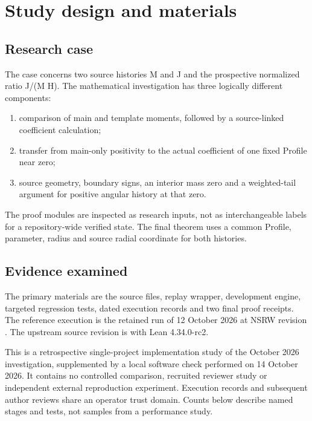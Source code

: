 \documentclass[11pt,a4paper]{article}
\begin{document}
\section{Study design and materials}

\subsection{Research case}

The case concerns two source histories M and J and the prospective normalized ratio J/(M H). The mathematical investigation has three logically different components:

\begin{enumerate}
\item comparison of main and template moments, followed by a source-linked coefficient calculation;
\item transfer from main-only positivity to the actual coefficient of one fixed Profile near zero;
\item source geometry, boundary signs, an interior mass zero and a weighted-tail argument for positive angular history at that zero.
\end{enumerate}

The proof modules are inspected as research inputs, not as interchangeable labels for a repository-wide verified state. The final theorem uses a common Profile, parameter, radius and source radial coordinate for both histories.

\subsection{Evidence examined}

The primary materials are the source files, replay wrapper, development engine, targeted regression tests, dated execution records and two final proof receipts. The reference execution is the retained run of 12 October 2026 at NSRW revision  \cite{ref7,ref8}. The upstream source revision is  with Lean 4.34.0-rc2.

This is a retrospective single-project implementation study of the October 2026 investigation, supplemented by a local software check performed on 14 October 2026. It contains no controlled comparison, recruited reviewer study or independent external reproduction experiment. Execution records and subsequent author reviews share an operator trust domain. Counts below describe named stages and tests, not samples from a performance study.
\end{document}

